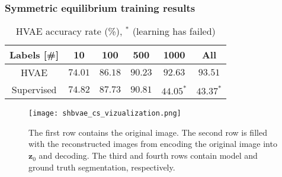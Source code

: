 \documentclass[11pt]{beamer}
\begin{document}
\begin{frame}
    \frametitle{Symmetric equilibrium training results}    
    \begin{table}[tbh]
        \begin{tabular}{|c|c|c|c|c|c|}
        \hline
        Labels [\#]  & 10 & 100 & 500 & 1000 & All \\
        \hline
        HVAE & $74.01$ & $86.18$ & $90.23$ & $92.63$ & $93.51$ \\
        \hline
        Supervised & $74.82$ & $87.73$ & $90.81$ &$44.05^\ast$ &  $43.37^\ast$  \\
        \hline
        \end{tabular}
        \caption[HVAE plain accuracy on CityScape]{HVAE accuracy rate (\%), $^\ast$ (learning has failed) }
        \label{tab:hvae-cityscapes-acc}
    \end{table}
    
    \begin{figure}[t]
        \centering
        \texttt{[image: shbvae\_cs\_vizualization.png]}
        \caption[Symmetric learning HVAE CityScape results]{The first row contains the original image. The second row is filled with the reconstructed
        images from encoding the original image into $\mathbf{z}_0$ and decoding. The third and fourth rows contain model and ground truth segmentation, respectively.}
        \label{fig:hvae-cs}
    \end{figure}
\end{frame}

    
\end{document}
